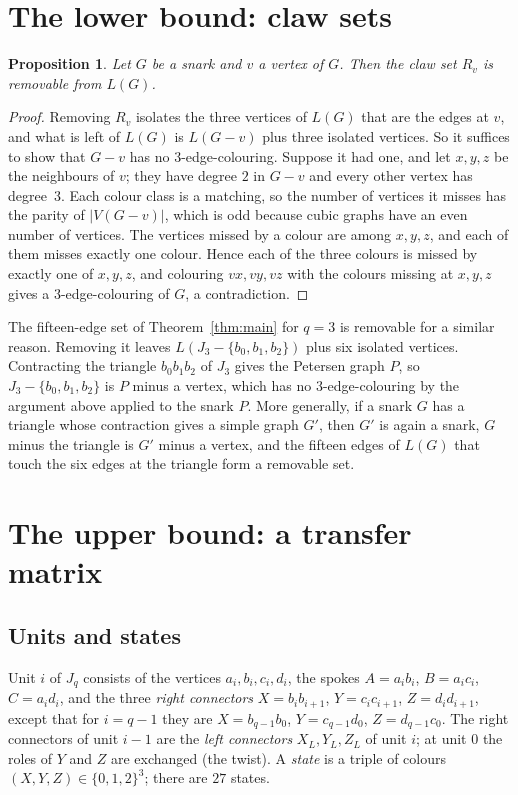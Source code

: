 \documentclass[11pt]{amsart}
\newtheorem{proposition}[theorem]{Proposition}
\theoremstyle{remark}
\begin{document}
\section{The lower bound: claw sets}
\begin{proposition}\label{prop:claw}
Let $G$ be a snark and $v$ a vertex of $G$. Then the claw set $R_v$ is removable from $L(G)$.
\end{proposition}
\begin{proof}
Removing $R_v$ isolates the three vertices of $L(G)$ that are the edges at $v$, and what is left of $L(G)$ is
$L(G-v)$ plus three isolated vertices. So it suffices to show that $G-v$ has no $3$-edge-colouring. Suppose it
had one, and let $x,y,z$ be the neighbours of $v$; they have degree $2$ in $G-v$ and every other vertex has
degree~$3$. Each colour class is a matching, so the number of vertices it misses has the parity of
$|V(G-v)|$, which is odd because cubic graphs have an even number of vertices. The vertices missed by a colour
are among $x,y,z$, and each of them misses exactly one colour. Hence each of the three colours is missed by
exactly one of $x,y,z$, and colouring $vx,vy,vz$ with the colours missing at $x,y,z$ gives a $3$-edge-colouring
of $G$, a contradiction.
\end{proof}

The fifteen-edge set of Theorem~\ref{thm:main} for $q=3$ is removable for a similar reason. Removing it leaves
$L(J_3-\{b_0,b_1,b_2\})$ plus six isolated vertices. Contracting the triangle $b_0b_1b_2$ of $J_3$ gives the
Petersen graph $P$, so $J_3-\{b_0,b_1,b_2\}$ is $P$ minus a vertex, which has no $3$-edge-colouring by the
argument above applied to the snark $P$. More generally, if a snark $G$ has a triangle whose contraction gives a
simple graph $G'$, then $G'$ is again a snark, $G$ minus the triangle is $G'$ minus a vertex, and the fifteen
edges of $L(G)$ that touch the six edges at the triangle form a removable set.

\section{The upper bound: a transfer matrix}
\subsection*{Units and states}
Unit $i$ of $J_q$ consists of the vertices $a_i,b_i,c_i,d_i$, the spokes $A=a_ib_i$, $B=a_ic_i$, $C=a_id_i$, and the
three \emph{right connectors} $X=b_ib_{i+1}$, $Y=c_ic_{i+1}$, $Z=d_id_{i+1}$, except that for $i=q-1$ they are
$X=b_{q-1}b_0$, $Y=c_{q-1}d_0$, $Z=d_{q-1}c_0$. The right connectors of unit $i-1$ are the \emph{left connectors}
$X_L,Y_L,Z_L$ of unit $i$; at unit $0$ the roles of $Y$ and $Z$ are exchanged (the twist). A \emph{state} is a
triple of colours $(X,Y,Z)\in\{0,1,2\}^3$; there are $27$ states.
\end{document}
